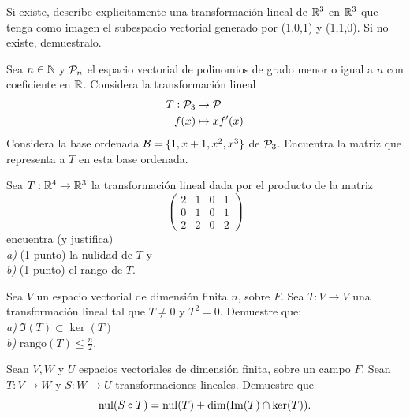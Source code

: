 \documentclass[12pt,a4paper]{book}
\begin{document}
    \begin{ejercicio}
        Si existe, describe explicitamente una transformación lineal de $\mathbb{R}^{3}$
        en $\mathbb{R}^{3}$ que tenga como imagen el subespacio vectorial generado por (1,0,1) y
        (1,1,0). Si no existe, demuestralo.
    \end{ejercicio}

    \begin{ejercicio}
        Sea $n\in\mathbb{N}$ y $\mathcal{P}_{n}$ el espacio vectorial de polinomios
        de grado menor o igual a $n$ con coeficiente en $\mathbb{R}$. Considera la transformación
        lineal
        \begin{align*}
            T:\mathcal{P}_{3}&\to\mathcal{P}\\
            f(x)&\mapsto xf^{\prime}(x)
        \end{align*}
        Considera la base ordenada $\mathcal{B}=\{1,x+1,x^{2},x^{3}\}$ de $\mathcal{P}_{3}$. Encuentra la matriz
        que representa a $T$ en esta base ordenada.
    \end{ejercicio}

    \begin{ejercicio}
        Sea $T:\mathbb{R}^{4}\to\mathbb{R}^{3}$ la transformación lineal dada por el producto de la matriz
        \begin{equation*}
            \begin{pmatrix}
                2 & 1 & 0 & 1\\
                0 & 1 & 0 & 1\\
                2 & 2 & 0 & 2
            \end{pmatrix}
        \end{equation*}
        encuentra (y justifica)\\
        \textit{a)} (1 punto) la nulidad de $T$ y\\
        \textit{b)} (1 punto) el rango de $T$.
    \end{ejercicio}

    \begin{ejercicio}
        Sea $V$ un espacio vectorial de dimensión finita $n$, sobre $F$. Sea $T:V\to V$
        una transformación lineal tal que $T\neq 0$ y $T^{2}=0$. Demuestre que:\\
        \textit{a)} $\Im(T)\subset\ker(T)$\\
        \textit{b)} $\text{rango}(T)\leq\frac{n}{2}$.
    \end{ejercicio}

    \begin{ejercicio}
        Sean $V,W$ y $U$ espacios vectoriales de dimensión finita, sobre un campo $F$. Sean $T:V\to W$ y $S:W\to U$ transformaciones lineales.
        Demuestre que
        \begin{equation*}
            \operatorname{nul}(S\circ T)=\operatorname{nul}(T)+\dim(\Im(T)\cap\ker(T)).
        \end{equation*}
    \end{ejercicio}
\end{document}
